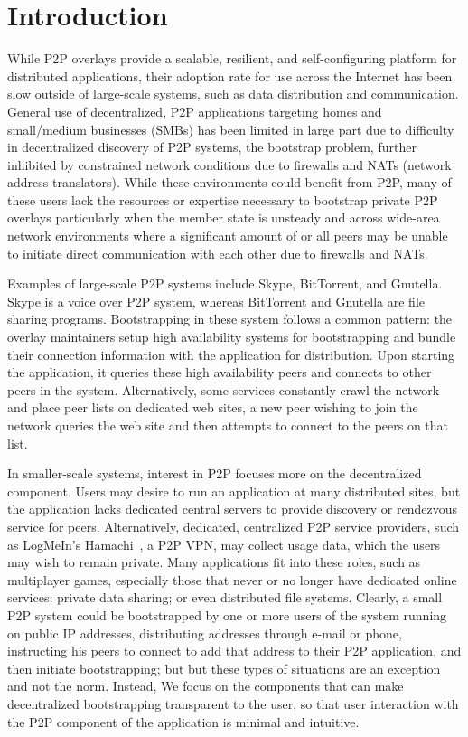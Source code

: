 \documentclass[conference]{IEEEtran}
\begin{document}
\section{Introduction}

While P2P overlays provide a scalable, resilient, and self-configuring platform
for distributed applications, their adoption rate for use across the Internet
has been slow outside of large-scale systems, such as data distribution and
communication.  General use of decentralized, P2P applications targeting homes
and small/medium businesses (SMBs) has been limited in large part due to
difficulty in decentralized discovery of P2P systems, the bootstrap problem,
further inhibited by constrained network conditions due to firewalls and NATs
(network address translators).  While these environments could benefit from
P2P, many of these users lack the resources or expertise necessary to bootstrap
private P2P overlays particularly when the member state is unsteady and across
wide-area network environments where a significant amount of or all peers may
be unable to initiate direct communication with each other due to firewalls and
NATs.

Examples of large-scale P2P systems include Skype, BitTorrent, and Gnutella.
Skype is a voice over P2P system, whereas BitTorrent and Gnutella are file
sharing programs.  Bootstrapping in these system follows a common pattern: the
overlay maintainers setup high availability systems for bootstrapping and
bundle their connection information with the application for distribution.
Upon starting the application, it queries these high availability peers and
connects to other peers in the system.  Alternatively, some services constantly
crawl the network and place peer lists on dedicated web sites, a new peer
wishing to join the network queries the web site and then attempts to connect
to the peers on that list.

In smaller-scale systems, interest in P2P focuses more on the decentralized
component.  Users may desire to run an application at many distributed sites,
but the application lacks dedicated central servers to provide discovery or
rendezvous service for peers.  Alternatively, dedicated, centralized P2P
service providers, such as LogMeIn's Hamachi~\cite{hamachi}, a P2P VPN, may
collect usage data, which the users may wish to remain private.  Many
applications fit into these roles, such as multiplayer games, especially those
that never or no longer have dedicated online services; private data sharing;
or even distributed file systems.  Clearly, a small P2P system could be
bootstrapped by one or more users of the system running on public IP addresses,
distributing addresses through e-mail or phone, instructing his peers to
connect to add that address to their P2P application, and then initiate
bootstrapping; but but these types of situations are an exception and not the
norm.  Instead, We focus on the components that can make decentralized
bootstrapping transparent to the user, so that user interaction with the P2P
component of the application is minimal and intuitive.
\end{document}
